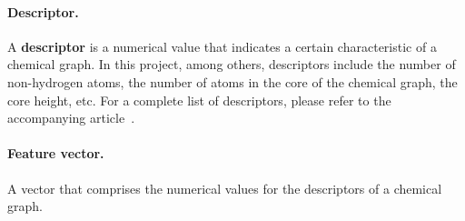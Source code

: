 \documentclass[11pt,titlepage,dvipdfmx,twoside]{book}
\begin{document}
\paragraph{Descriptor.}
A {\bf descriptor} is a numerical value that 
indicates a certain characteristic of a chemical graph.
In this project, among others, descriptors include
the number of non-hydrogen atoms, the number of atoms in the core of the 
chemical graph, the core height, etc.
For a complete list of descriptors, please refer to the 
accompanying article~\cite{AN20}.


\paragraph{Feature vector.}
A vector that comprises the numerical values for
the descriptors of a chemical graph.
\end{document}
